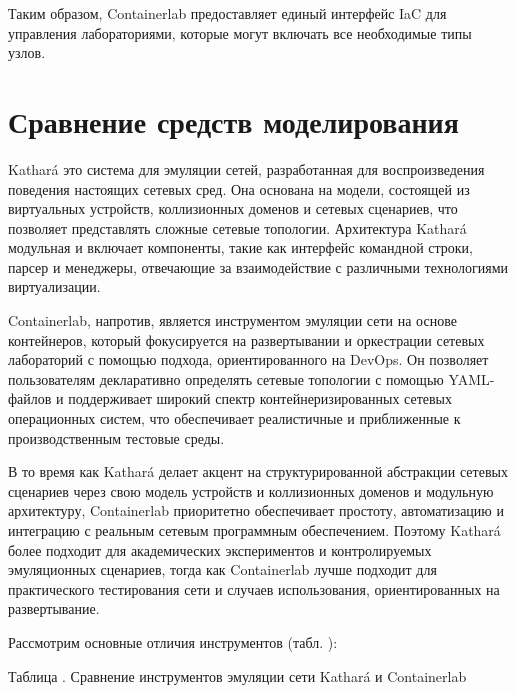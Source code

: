 \documentclass[
  english,
  russian,
  12pt,
  a4paper,
]{phdthesr}
\begin{document}
Таким образом, Containerlab предоставляет единый интерфейс IaC для
управления лабораториями, которые могут включать все необходимые типы
узлов.

\section{Сравнение средств
моделирования}\label{ux441ux440ux430ux432ux43dux435ux43dux438ux435-ux441ux440ux435ux434ux441ux442ux432-ux43cux43eux434ux435ux43bux438ux440ux43eux432ux430ux43dux438ux44f}

Kathará это система для эмуляции сетей, разработанная для
воспроизведения поведения настоящих сетевых сред. Она основана на
модели, состоящей из виртуальных устройств, коллизионных доменов и
сетевых сценариев, что позволяет представлять сложные сетевые топологии.
Архитектура Kathará модульная и включает компоненты, такие как интерфейс
командной строки, парсер и менеджеры, отвечающие за взаимодействие с
различными технологиями виртуализации.

Containerlab, напротив, является инструментом эмуляции сети на основе
контейнеров, который фокусируется на развертывании и оркестрации сетевых
лабораторий с помощью подхода, ориентированного на DevOps. Он позволяет
пользователям декларативно определять сетевые топологии с помощью
YAML-файлов и поддерживает широкий спектр контейнеризированных сетевых
операционных систем, что обеспечивает реалистичные и приближенные к
производственным тестовые среды.

В то время как Kathará делает акцент на структурированной абстракции
сетевых сценариев через свою модель устройств и коллизионных доменов и
модульную архитектуру, Containerlab приоритетно обеспечивает простоту,
автоматизацию и интеграцию с реальным сетевым программным обеспечением.
Поэтому Kathará более подходит для академических экспериментов и
контролируемых эмуляционных сценариев, тогда как Containerlab лучше
подходит для практического тестирования сети и случаев использования,
ориентированных на развертывание.

Рассмотрим основные отличия инструментов (табл.
\autocite{tab-kathara-vs-containerlab} ):

Таблица \autocite{tab-kathara-vs-containerlab}. Сравнение инструментов
эмуляции сети Kathará и Containerlab
\end{document}
